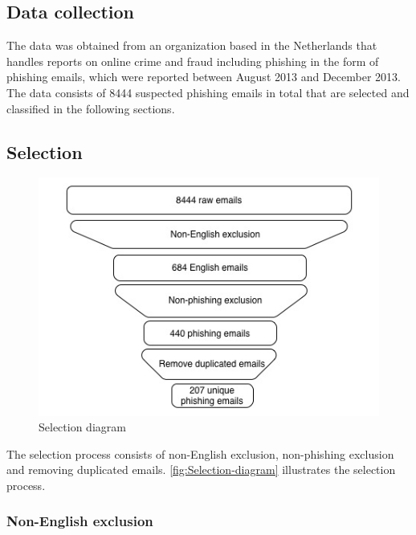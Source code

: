 \subsection{Data collection}

The data was obtained from an organization based in the Netherlands
that handles reports on online crime and fraud including phishing
in the form of phishing emails, which were reported between August
2013 and December 2013. The data consists of 8444 suspected phishing
emails in total that are selected and classified in the following
sections.


\subsection{\label{sub:Selection}Selection}

\begin{figure}[H]
%


%
\begin{centering}
\includegraphics[scale=0.7]{gfx/selection}\protect\caption{\label{fig:Selection-diagram}Selection diagram}

\par\end{centering}

%
%
\end{figure}


The selection process consists of non-English exclusion, non-phishing
exclusion and removing duplicated emails. \autoref{fig:Selection-diagram}
illustrates the selection process.


\subsubsection{Non-English exclusion}

